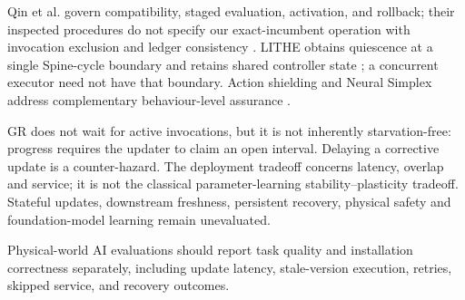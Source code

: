 \documentclass{article}
\begin{document}
Qin et al. govern compatibility, staged evaluation, activation, and rollback; their inspected procedures do not specify our exact-incumbent operation with invocation exclusion and ledger consistency \citep{qin2026governed}. LITHE obtains quiescence at a single Spine-cycle boundary and retains shared controller state \citep{lim2026lithe}; a concurrent executor need not have that boundary. Action shielding and Neural Simplex address complementary behaviour-level assurance \citep{alshiekh2018shielding,phan2020neural}.

GR does not wait for active invocations, but it is not inherently starvation-free: progress requires the updater to claim an open interval. Delaying a corrective update is a counter-hazard. The deployment tradeoff concerns latency, overlap and service; it is not the classical parameter-learning stability--plasticity tradeoff. Stateful updates, downstream freshness, persistent recovery, physical safety and foundation-model learning remain unevaluated.

Physical-world AI evaluations should report task quality and installation correctness separately, including update latency, stale-version execution, retries, skipped service, and recovery outcomes.
\clearpage


\clearpage
\appendix

\end{document}
